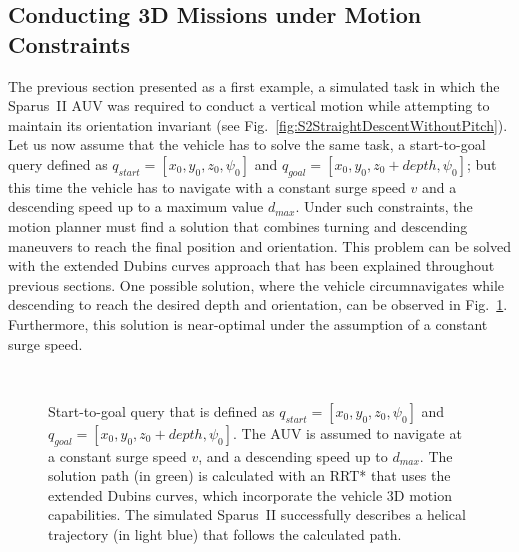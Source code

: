 \subsection{Conducting 3D Missions under Motion Constraints}

The previous section presented as a first example, a simulated task in which the
Sparus~II \ac{AUV} was required to conduct a vertical motion while attempting to
maintain its orientation invariant (see
Fig.~\ref{fig:S2StraightDescentWithoutPitch}). Let us now assume that the vehicle
has to solve the same task, \ie a start-to-goal query defined as $q_{start} =
[x_0, y_0, z_0, \psi_0]$ and $q_{goal} = [x_0, y_0, z_0+depth, \psi_0]$; but
this time the vehicle has to navigate with a constant surge speed $v$ and a
descending speed up to a maximum value $d_{max}$. Under such constraints, the
motion planner must find a solution that combines turning and descending
maneuvers to reach the final position and orientation. This problem can be
solved with the extended Dubins curves approach that has been explained
throughout previous sections. One possible solution, where the vehicle
circumnavigates while descending to reach the desired depth and orientation, can
be observed in Fig.~\ref{fig:CircDescDubinsRRTstar3D}. Furthermore, this
solution is near-optimal under the assumption of a constant surge speed.


\begin{figure}[htbp]
    \myfloatalign
     \quad
    \\
      \quad
\caption[3D Start-to-goal query that requires circumnavigating while descending
to reach the desired depth and orientation.]
{Start-to-goal query that is defined as $q_{start} = [x_0, y_0, z_0, \psi_0]$
and $q_{goal} = [x_0, y_0, z_0+depth, \psi_0]$. The AUV is assumed to navigate
at a constant surge speed $v$, and a descending speed up to $d_{max}$. The
solution path (in green) is calculated with an RRT* that uses the extended
Dubins curves, which incorporate the vehicle 3D motion capabilities. The
simulated Sparus~II successfully describes a helical trajectory (in light blue)
that follows the calculated path.}
\label{fig:CircDescDubinsRRTstar3D}
\end{figure}

